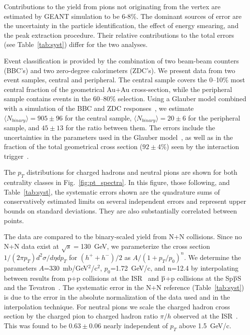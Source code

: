 \begin{multicols}{2}
Contributions to the yield from pions not originating from the 
vertex are estimated by GEANT simulation to be 6-8\%.  
The dominant sources of error are the uncertainty in the particle 
identification, the effect of energy smearing, and the peak 
extraction procedure.  Their relative contributions to the total 
errors (see Table~\ref{tab:syst}) differ for the two analyses.  


%

Event classification is provided by the combination 
of two beam-beam counters (BBC's) and two zero-degree calorimeters 
(ZDC's).  We present data from two event samples,
central and peripheral. The central sample covers the 0--10\% most 
central fraction of the geometrical Au+Au cross-section, while
the peripheral sample contains events in the 60--80\% selection.
Using a Glauber model combined 
with a simulation of the BBC and ZDC responses~\cite{mult}, we estimate 
$\langle N_{binary} \rangle = 905 \pm 96$ for the central sample,
$\langle N_{binary} \rangle = 20 \pm 6$ for the 
peripheral sample, and $45 \pm 13$ for the ratio between them. 
The errors include the uncertainties in the 
parameters used in the Glauber model~\cite{foot1},
as well as in the fraction of the total geometrical cross section
($92\pm 4\%$) seen by the interaction trigger~\cite{foot2}.

%
%
%

The $p_T$ distributions for charged hadrons and neutral pions 
are shown for both centrality classes in Fig.~\ref{fig:pt_spectra}. 
In this figure, those following, and Table~\ref{tab:syst}, 
the systematic errors shown are the quadrature sums of conservatively 
estimated limits on several independent errors and 
represent upper bounds on standard deviations.
%
%
They are also substantially correlated between points.

The data are compared to the binary-scaled yield from N+N
collisions.  Since no N+N data exist at $\sqrt{s}=$130~GeV,
we parameterize the cross section 
$1/(2 \pi p_{T}) d^2\sigma/d\eta dp_{T}$ for $(h^{+}+h^{-})/2$ as
$A/(1+ p_T/p_0)^n$.  We determine the parameters 
$A$=330~mb/GeV$^2$/c$^2$, $p_{0}$=1.72~GeV/c, and n=12.4
by interpolating between results from p+p collisions at 
the ISR~\cite{alper} and $\overline{\rm p}$+p collisions 
at the Sp$\overline{\rm p}$S~\cite{ua1} and the Tevatron~\cite{cdf}. 
The systematic error in the N+N reference (Table~\ref{tab:syst})
is due to the error in the absolute normalization of the data
used and in the interpolation technique.
For neutral pions we 
scale the charged hadron cross section by the 
charged pion to charged hadron ratio $\pi/h$ observed at the 
ISR~\cite{alper}.  This was found to be $0.63\pm 0.06$ nearly 
independent of $p_T$ above 1.5~GeV/c. 


\end{multicols}
